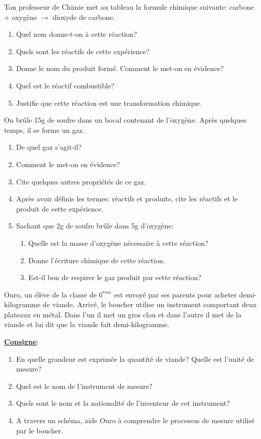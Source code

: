 \documentclass[12pt,a4paper]{book}
\begin{document}
\begin{exo}
Ton professeur de Chimie met au tableau la formule chimique suivante: carbone + oxygène $\rightarrow$ dioxyde de carbone.
\begin{enumerate}
\item Quel nom donne-t-on à cette réaction?
\item Quels sont les réactifs de cette expérience?
\item Donne le nom du produit formé. Comment le met-on en évidence?
\item Quel est le réactif combustible?
\item Justifie que cette réaction est une transformation chimique.
\end{enumerate}
\end{exo}

\begin{exo}
On brûle 15g de soufre dans un bocal contenant de l'oxygène. Après quelques temps, il se forme un gaz.
\begin{enumerate}
\item De quel gaz s'agit-il?
\item Comment le met-on en évidence?
\item Cite quelques autres propriétés de ce gaz.
\item Après avoir définis les termes: réactifs et produits, cite les réactifs et le produit de cette expérience.
\item Sachant que 2g de soufre brûle dans 5g d'oxygène:
\begin{enumerate}
\item Quelle est la masse d'oxygène nécessaire à cette réaction?
\item Donne l'écriture chimique de cette réaction.
\item Est-il bon de respirer le gaz produit par cette réaction?
\end{enumerate}
\end{enumerate}
\end{exo}

\begin{exo}
Ouro, un élève de la classe de $6^{ème}$ est envoyé par ses parents pour acheter demi-kilogramme de viande. Arrivé, le boucher utilise un instrument comportant deux plateaux en métal. Dans l'un il met un gros clou et dans l'autre il met de la viande et lui dit que la viande fait demi-kilogramme.

\textbf{\underline{Consigne}}:
\begin{enumerate}
\item En quelle grandeur est exprimée la quantité de viande? Quelle est l'unité de mesure?
\item Quel est le nom de l'instrument de mesure?
\item Quels sont le nom et la nationalité de l'inventeur de cet instrument?
\item A travers un schéma, aide Ouro à comprendre le processus de mesure utilisé par le boucher.
\end{enumerate}
\end{exo}
\end{document}

